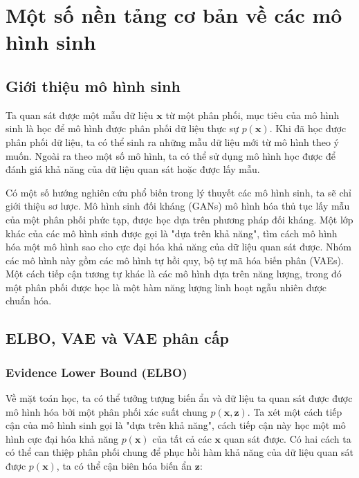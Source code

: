 \documentclass[14pt, a4paper]{article}
\numberwithin{equation}{section}
\numberwithin{figure}{section}
\numberwithin{dl}{section}
\numberwithin{md}{section}
\numberwithin{bd}{section}
\numberwithin{dn}{section}
\numberwithin{hq}{section}
\begin{document}
    \section{Một số nền tảng cơ bản về các mô hình sinh}

    \subsection{Giới thiệu mô hình sinh}

    Ta quan sát được một mẫu dữ liệu $\boldsymbol{x}$ từ một phân phối, mục tiêu của mô hình sinh là học để mô hình được phân phối dữ liệu thực sự $p(\boldsymbol{x})$.
    Khi đã học được phân phối dữ liệu, ta có thể sinh ra những mẫu dữ liệu mới từ mô hình theo ý muốn.
    Ngoài ra theo một số mô hình, ta có thể sử dụng mô hình học được để đánh giá khả năng của dữ liệu quan sát hoặc được lấy mẫu.

    Có một số hướng nghiên cứu phổ biến trong lý thuyết các mô hình sinh, ta sẽ chỉ giới thiệu sơ lược.
    Mô hình sinh đối kháng (GANs) mô hình hóa thủ tục lấy mẫu của một phân phối phức tạp, được học dựa trên phương pháp đối kháng.
    Một lớp khác của các mô hình sinh được gọi là "dựa trên khả năng", tìm cách mô hình hóa một mô hình sao cho cực đại hóa khả năng của dữ liệu quan sát được.
    Nhóm các mô hình này gồm các mô hình tự hồi quy, bộ tự mã hóa biến phân (VAEs).
    Một cách tiếp cận tương tự khác là các mô hình dựa trên năng lượng, trong đó một phân phối được học là một hàm năng lượng linh hoạt ngẫu nhiên được chuẩn hóa.

    \subsection{ELBO, VAE và VAE phân cấp}

    \subsubsection{Evidence Lower Bound (ELBO)}

    Về mặt toán học, ta có thể tưởng tượng biến ẩn và dữ liệu ta quan sát được được mô hình hóa bởi một phân phối xác suất chung $p(\boldsymbol{x}, \boldsymbol{z})$.
    Ta xét một cách tiếp cận của mô hình sinh gọi là "dựa trên khả năng", cách tiếp cận này học một mô hình cực đại hóa khả năng $p(\boldsymbol{x})$ của tất cả các $\boldsymbol{x}$ quan sát được.
    Có hai cách ta có thể can thiệp phân phối chung để phục hồi hàm khả năng của dữ liệu quan sát được $p(\boldsymbol{x})$, ta có thể cận biên hóa biến ẩn $\boldsymbol{z}$:
\end{document}
